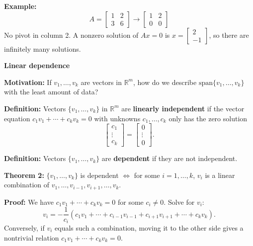 \documentclass{article}
\begin{document}
\textbf{Example:}
\[
A = \begin{bmatrix} 1 & 2 \\ 3 & 6 \end{bmatrix} \to \begin{bmatrix} 1 & 2 \\ 0 & 0 \end{bmatrix}
\]
No pivot in column 2. A nonzero solution of $Ax = 0$ is $x = \begin{bmatrix} 2 \\ -1 \end{bmatrix}$, so there are infinitely many solutions.

\newpage

\textbf{Linear dependence}

\medskip

\textbf{Motivation:} If $v_1, \ldots, v_k$ are vectors in $\mathbb{R}^m$, how do we describe $\mathrm{span}\{v_1, \ldots, v_k\}$ with the least amount of data?

\bigskip

\textbf{Definition:} Vectors $\{v_1, \ldots, v_k\}$ in $\mathbb{R}^m$ are \textbf{linearly independent} if the vector equation $c_1 v_1 + \cdots + c_k v_k = 0$ with unknowns $c_1, \ldots, c_k$ only has the zero solution
\[
\begin{bmatrix} c_1 \\ \vdots \\ c_k \end{bmatrix} = \begin{bmatrix} 0 \\ \vdots \\ 0 \end{bmatrix}.
\]

\medskip

\textbf{Definition:} Vectors $\{v_1, \ldots, v_k\}$ are \textbf{dependent} if they are not independent.

\bigskip

\textbf{Theorem 2:} $\{v_1, \ldots, v_k\}$ is dependent $\iff$ for some $i = 1, \ldots, k$, $v_i$ is a linear combination of $v_1, \ldots, v_{i-1}, v_{i+1}, \ldots, v_k$.

\medskip

\textbf{Proof:} We have $c_1 v_1 + \cdots + c_k v_k = 0$ for some $c_i \neq 0$. Solve for $v_i$:
\[
v_i = -\frac{1}{c_i}\left(c_1 v_1 + \cdots + c_{i-1} v_{i-1} + c_{i+1} v_{i+1} + \cdots + c_k v_k\right).
\]
Conversely, if $v_i$ equals such a combination, moving it to the other side gives a nontrivial relation $c_1 v_1 + \cdots + c_k v_k = 0$.
\end{document}
